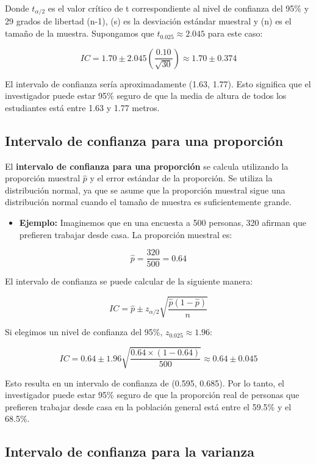 \documentclass[
  letterpaper,
  DIV=11,
  numbers=noendperiod]{scrreprt}
\providecommand{\tightlist}{%
  \setlength{\itemsep}{0pt}\setlength{\parskip}{0pt}}\usepackage{longtable,booktabs,array}
\begin{document}
Donde \(t_{\alpha/2}\) es el valor crítico de t correspondiente al nivel
de confianza del 95\% y 29 grados de libertad (n-1), (s) es la
desviación estándar muestral y (n) es el tamaño de la muestra.
Supongamos que \(t_{0.025} \approx 2.045\) para este caso:

\[IC = 1.70 \pm 2.045 \left(\frac{0.10}{\sqrt{30}}\right) \approx 1.70 \pm 0.374\]

El intervalo de confianza sería aproximadamente (1.63, 1.77). Esto
significa que el investigador puede estar 95\% seguro de que la media de
altura de todos los estudiantes está entre 1.63 y 1.77 metros.

\subsection{Intervalo de confianza para una
proporción}\label{intervalo-de-confianza-para-una-proporciuxf3n}

El \textbf{intervalo de confianza para una proporción} se calcula
utilizando la proporción muestral \(\hat{p}\) y el error estándar de la
proporción. Se utiliza la distribución normal, ya que se asume que la
proporción muestral sigue una distribución normal cuando el tamaño de
muestra es suficientemente grande.

\begin{itemize}
\tightlist
\item
  \textbf{Ejemplo:} Imaginemos que en una encuesta a 500 personas, 320
  afirman que prefieren trabajar desde casa. La proporción muestral es:
\end{itemize}

\[ \hat{p} = \frac{320}{500} = 0.64 \]

El intervalo de confianza se puede calcular de la siguiente manera:

\[ IC = \hat{p} \pm z_{\alpha/2} \sqrt{\frac{\hat{p}(1 - \hat{p})}{n}} \]

Si elegimos un nivel de confianza del 95\%, \(z_{0.025} \approx 1.96\):

\[ IC = 0.64 \pm 1.96 \sqrt{\frac{0.64 \times (1 - 0.64)}{500}} \approx 0.64 \pm 0.045 \]

Esto resulta en un intervalo de confianza de (0.595, 0.685). Por lo
tanto, el investigador puede estar 95\% seguro de que la proporción real
de personas que prefieren trabajar desde casa en la población general
está entre el 59.5\% y el 68.5\%.

\subsection{Intervalo de confianza para la
varianza}\label{intervalo-de-confianza-para-la-varianza}
\end{document}
